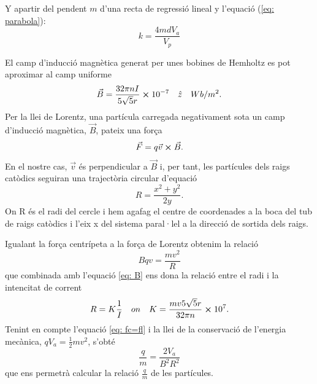 \documentclass[11pt]{article}
\begin{document}
Y apartir del pendent $m$ d'una recta de regressió lineal y l'equació (\ref{eq: parabola}):
 \begin{equation}
      k =\frac{4mdV_a}{V_p}
      \label{eq: k}
 \end{equation}

\vspace{1cm}

El camp d'inducció magnètica generat per unes bobines de Hemholtz es pot aproximar al camp uniforme 
\begin{equation}
    \vec{B}=\frac{32\pi nI}{5\sqrt{5}r}\cross10^{-7} \quad \hat{z}\quad Wb/m^2.
    \label{eq: B}
\end{equation}
Per la llei de Lorentz, una partícula carregada negativament sota un camp d'inducció magnètica, $\vec{B}$, pateix una força
\begin{equation}
    \vec{F}=q\vec{v}\cross\vec{B}.
    \label{eq: Lorentz} 
\end{equation} 
En el nostre cas, $\vec{v}$ és perpendicular a $\vec{B }$ i, per tant, les partícules dels raigs catòdics seguiran una trajectòria circular d'equació
\begin{equation}
    R=\frac{x^2+y^2}{2y}.
    \label{eq: radi}
\end{equation}
On R és el radi del cercle i hem agafag el centre de coordenades a la boca del tub de raigs catòdics i l'eix x del sistema paral·lel a la direcció de sortida dels raigs.

Igualant la força centrípeta a la força de Lorentz obtenim la relació 
\begin{equation}
    Bqv=\frac{mv^2}{R}
    \label{eq: fc=fl}
\end{equation}
que combinada amb l'equació \ref{eq: B} ens dona la relació entre el radi i la intencitat de corrent
\begin{equation}
    R=K\frac{1}{I} \quad on \quad K=\frac{mv5\sqrt{5}r}{32\pi n}\cross 10^7.
    \label{eq: IvsR}
\end{equation}
Tenint en compte l'equació \ref{eq: fc=fl} i la llei de la conservació de l'energia mecànica, $qV_a = \frac{1}{2}mv^2$, s'obté 
\begin{equation}
    \frac{q}{m}=\frac{2V_a }{B^2R^2}
    \label{eq: q/m}
\end{equation}
que ens permetrà calcular la relació $\frac{q}{m}$ de les partícules.
\end{document}
